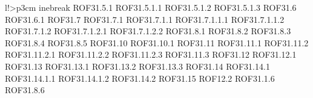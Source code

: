 \begin{tabella}{l!{\VRule}>{\centering\arraybackslash}p{3cm}}
inebreak ROF31.5.1 \linebreak ROF31.5.1.1 \linebreak ROF31.5.1.2 \linebreak ROF31.5.1.3 \linebreak ROF31.6 \linebreak ROF31.6.1 \linebreak ROF31.7 \linebreak ROF31.7.1 \linebreak ROF31.7.1.1 \linebreak ROF31.7.1.1.1 \linebreak ROF31.7.1.1.2 \linebreak ROF31.7.1.2 \linebreak ROF31.7.1.2.1 \linebreak ROF31.7.1.2.2 \linebreak ROF31.8.1 \linebreak ROF31.8.2 \linebreak ROF31.8.3 \linebreak ROF31.8.4 \linebreak ROF31.8.5 \linebreak ROF31.10 \linebreak ROF31.10.1 \linebreak ROF31.11 \linebreak ROF31.11.1 \linebreak ROF31.11.2 \linebreak ROF31.11.2.1 \linebreak ROF31.11.2.2 \linebreak ROF31.11.2.3 \linebreak ROF31.11.3 \linebreak ROF31.12 \linebreak ROF31.12.1 \linebreak ROF31.13 \linebreak ROF31.13.1 \linebreak ROF31.13.2 \linebreak ROF31.13.3 \linebreak ROF31.14 \linebreak ROF31.14.1 \linebreak ROF31.14.1.1 \linebreak ROF31.14.1.2 \linebreak ROF31.14.2 \linebreak ROF31.15 \linebreak ROF12.2 \linebreak ROF31.1.6 \linebreak ROF31.8.6 \\

\end{tabella}
